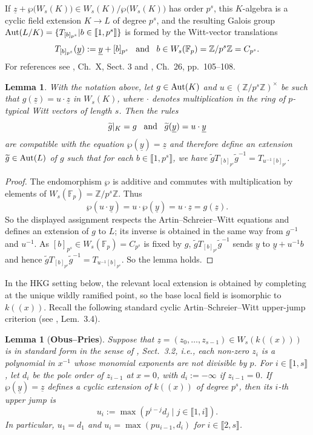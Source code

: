 \documentclass[11pt]{amsart}
\newtheorem{lemma}[theorem]{Lemma}
\def\Aut{\textup{Aut}}
\begin{document}
If $\underline{z}+\wp\bigl(W_s(K)\bigr)\in W_s(K)/\wp\bigl(W_s(K)\bigr)$ has order $p^s$, this $K$-algebra is a cyclic field
extension $K\rightarrow L$ of degree $p^s$, and the resulting Galois group $\Aut(L/K)=\{T_{[b]_{p^s}}|b\in\llbracket1,p^s\rrbracket\}$ is formed by the Witt-vector translations
\[
T_{[b]_{p^s}}(\underline{y}):=\underline{y}+[b]_{p^s}\;\;\;\textup{and}\;\;\; b\in W_s(\mathbb F_p)=\mathbb Z/p^s\mathbb Z=C_{p^s}.
\]
For references see \cite{S}, Ch.\ X, Sect. 3 and \cite{L}, Ch.\ 26,
pp.\ 105--108.

\begin{lemma}\label{L9}
With the notation above, let $g\in\Aut(K)$ and
$u\in(\mathbb Z/p^s\mathbb Z)^\times$ be such that $g(\underline{z})=u\cdot\underline{z}$ in $W_s(K)$, where $\cdot$ denotes
multiplication in the ring of $p$-typical Witt vectors of length $s$. Then the
rules
\[
\widetilde{g}|_K=g\;\;\;\textup{and}\;\;\;\widetilde{g}(\underline{y})=u\cdot\underline{y}
\]
are compatible with the equation $\wp(\underline{y})=\underline{z}$ and therefore define an extension $\widetilde{g}\in\Aut(L)$ of $g$ such that for each $b\in\llbracket1,p^s\rrbracket$, we have 
$\widetilde{g}T_{[b]_{p^s}}\widetilde{g}^{-1}=T_{u^{-1}[b]_{p^s}}$.
\end{lemma}

\begin{proof}
The endomorphism $\wp$ is additive and commutes with multiplication by elements
of $W_s(\mathbb F_p)=\mathbb Z/p^s\mathbb Z$. Thus
$$\wp(u\cdot\underline{y})=u\cdot\wp(\underline{y})
=u\cdot\underline{z}=g(\underline{z}).$$
So the displayed assignment respects the Artin--Schreier--Witt equations and
defines an extension of $g$ to $L$; its inverse is obtained in the same way
from $g^{-1}$ and $u^{-1}$. As $[b]_{p^s}\in W_s(\mathbb F_p)=C_{p^s}$ is fixed by $g$,
$\widetilde{g}T_{[b]_{p^s}}\widetilde{g}^{-1}$ sends $\underline{y}$ to
$\underline{y}+u^{-1}b$ and hence $\widetilde{g}T_{[b]_{p^s}}\widetilde{g}^{-1}=T_{u^{-1}[b]_{p^s}}$. So the lemma holds.
\end{proof}

\smallskip
In the HKG setting below, the relevant local extension is obtained by completing
at the unique wildly ramified point, so the base local field is isomorphic to
$k((x))$. Recall the following standard cyclic Artin--Schreier--Witt upper-jump criterion (see \cite{OP}, Lem.\ 3.4). 

\begin{lemma}[{\bf Obus--Pries}]
\label{L10}
Suppose that $\underline{z}=(z_0,\ldots,z_{s-1})\in W_s(k((x)))$ is in standard form in the sense of \cite{OP}, Sect.\ 3.2, i.e.,
each non-zero $z_i$ is a polynomial in $x^{-1}$ whose monomial exponents are not
divisible by $p$. For $i\in\llbracket1,s\rrbracket$, let $d_i$ be the pole order of $z_{i-1}$ at $x=0$, with
$d_i:=-\infty$ if $z_{i-1}=0$. If $\wp(\underline{y})=\underline{z}$ defines a cyclic extension of $k((x))$ of degree
$p^s$, then its $i$-th upper jump is
\[
u_i:=\max(p^{i-j}d_j\mid j\in\llbracket1,i\rrbracket).
\]
In particular, $u_1=d_1$ and $u_i=\max(p u_{i-1},d_i)$ for $i\in\llbracket2,s\rrbracket$.
\end{lemma}
\end{document}
